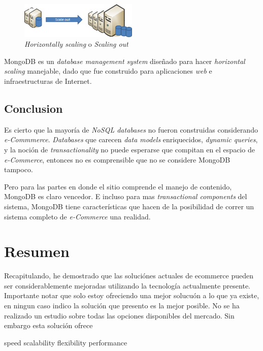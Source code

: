 \begin{figure}[h!]
	\centering
	\includegraphics[width=0.5\textwidth]{figuras/cap2/scale_out.png}
	\caption{\textit{Horizontally scaling} o \textit{Scaling out} }
\end{figure}

MongoDB es un \textit{database management system} diseñado para hacer \textit{horizontal scaling} manejable, dado que fue construido para aplicaciones \textit{web} e infraestructuras de Internet.

\subsection{Conclusion}

Es cierto que la mayoría de \textit{NoSQL databases} no fueron construidas considerando \textit{e-Commmerce}. \textit{Databases} que carecen \textit{data models} enriquecidos, \textit{dynamic queries}, y la noción de \textit{transactionality} no puede esperarse que compitan en el espacio de \textit{e-Commerce}, entonces no es comprensible que no se considere MongoDB tampoco.

Pero para las partes en donde el sitio \textit{} comprende el manejo de contenido, MongoDB es claro vencedor. E incluso para mas \textit{transactional components} del sistema, MongoDB tiene características que hacen de la posibilidad de correr un sistema completo de \textit{e-Commerce} una realidad.

\section{Resumen}

Recapitulando, he demostrado que las soluciónes actuales de ecommerce pueden ser considerablemente mejoradas utilizando la tecnología actualmente presente. 
Importante notar que solo estoy ofreciendo una mejor solucuón a lo que ya existe, en ningun caso indico la solución que presento es la mejor posible. No se ha realizado un estudio sobre todas las opciones disponibles del mercado. Sin embargo esta solución ofrece

speed
scalability
flexibility
performance
